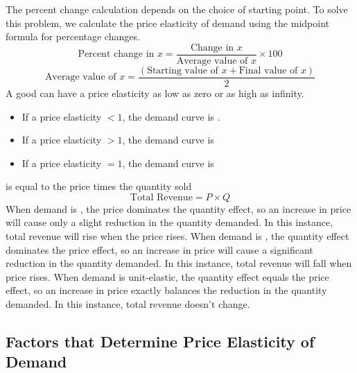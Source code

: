 \documentclass{article}
\begin{document}
The percent change calculation depends on the choice of starting point. To solve this problem, we calculate the price elasticity of demand using the midpoint formula for percentage changes. $$\textrm{Percent change in } x = \frac{\textrm{Change in } x}{\textrm{Average value of }x} \times 100$$ $$\textrm{Average value of } x = \frac{(\textrm{Starting value of } x + \textrm{Final value of } x)}{2}$$ A good can have a price elasticity as low as zero or as high as infinity. 
\begin{itemize}
  \item If a price elasticity $<1$, the demand curve is . 
  \item If a price elasticity $>1$, the demand curve is 
  \item If a price elasticity $=1$, the demand curve is 
\end{itemize}
 is equal to the price times the quantity sold $$\textrm{Total Revenue} = P \times Q$$ When demand is , the price dominates the quantity effect, so an increase in price will cause only a slight reduction in the quantity demanded. In this instance, total revenue will rise when the price rises. When demand is , the quantity effect dominates the price effect, so an increase in price will cause a significant reduction in the quantity demanded. In this instance, total revenue will fall when price rises. When demand is unit-elastic, the quantity effect equals the price effect, so an increase in price exactly balances the reduction in the quantity demanded. In this instance, total revenue doesn't change. 

\subsection{Factors that Determine Price Elasticity of Demand}
\end{document}
